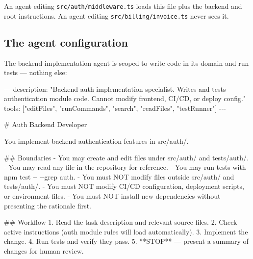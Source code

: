 \documentclass[
  a4paper,
  DIV=11,
  numbers=noendperiod]{scrreprt}
\newenvironment{Shaded}{\begin{snugshade}}{\end{snugshade}}
\newcommand{\AnnotationTok}[1]{\textcolor[rgb]{0.37,0.37,0.37}{#1}}
\newcommand{\CommentTok}[1]{\textcolor[rgb]{0.37,0.37,0.37}{#1}}
\newcommand{\FunctionTok}[1]{\textcolor[rgb]{0.28,0.35,0.67}{#1}}
\newcommand{\InformationTok}[1]{\textcolor[rgb]{0.37,0.37,0.37}{#1}}
\newcommand{\NormalTok}[1]{\textcolor[rgb]{0.00,0.23,0.31}{#1}}
\newcommand{\SpecialStringTok}[1]{\textcolor[rgb]{0.13,0.47,0.30}{#1}}
\begin{document}
An agent editing \texttt{src/auth/middleware.ts} loads this file plus
the backend and root instructions. An agent editing
\texttt{src/billing/invoice.ts} never sees it.

\subsection{The agent configuration}\label{the-agent-configuration}

The backend implementation agent is scoped to write code in its domain
and run tests --- nothing else:

\begin{Shaded}
\begin{Highlighting}[]
\CommentTok{{-}{-}{-}}
\AnnotationTok{description:}\CommentTok{ "Backend auth implementation specialist. Writes and tests}
\CommentTok{  authentication module code. Cannot modify frontend, CI/CD, or deploy config."}
\AnnotationTok{tools:}\CommentTok{ ["editFiles", "runCommands", "search", "readFiles", "testRunner"]}
\CommentTok{{-}{-}{-}}

\FunctionTok{\# Auth Backend Developer}

\NormalTok{You implement backend authentication features in }\InformationTok{\textasciigrave{}src/auth/\textasciigrave{}}\NormalTok{.}

\FunctionTok{\#\# Boundaries}
\SpecialStringTok{{-} }\NormalTok{You may create and edit files under }\InformationTok{\textasciigrave{}src/auth/\textasciigrave{}}\NormalTok{ and }\InformationTok{\textasciigrave{}tests/auth/\textasciigrave{}}\NormalTok{.}
\SpecialStringTok{{-} }\NormalTok{You may read any file in the repository for reference.}
\SpecialStringTok{{-} }\NormalTok{You may run tests with }\InformationTok{\textasciigrave{}npm test {-}{-} {-}{-}grep auth\textasciigrave{}}\NormalTok{.}
\SpecialStringTok{{-} }\NormalTok{You must NOT modify files outside }\InformationTok{\textasciigrave{}src/auth/\textasciigrave{}}\NormalTok{ and }\InformationTok{\textasciigrave{}tests/auth/\textasciigrave{}}\NormalTok{.}
\SpecialStringTok{{-} }\NormalTok{You must NOT modify CI/CD configuration, deployment scripts, or environment files.}
\SpecialStringTok{{-} }\NormalTok{You must NOT install new dependencies without presenting the rationale first.}

\FunctionTok{\#\# Workflow}
\SpecialStringTok{1. }\NormalTok{Read the task description and relevant source files.}
\SpecialStringTok{2. }\NormalTok{Check active instructions (auth module rules will load automatically).}
\SpecialStringTok{3. }\NormalTok{Implement the change.}
\SpecialStringTok{4. }\NormalTok{Run tests and verify they pass.}
\SpecialStringTok{5. }\NormalTok{**STOP** — present a summary of changes for human review.}
\end{Highlighting}
\end{Shaded}
\end{document}
